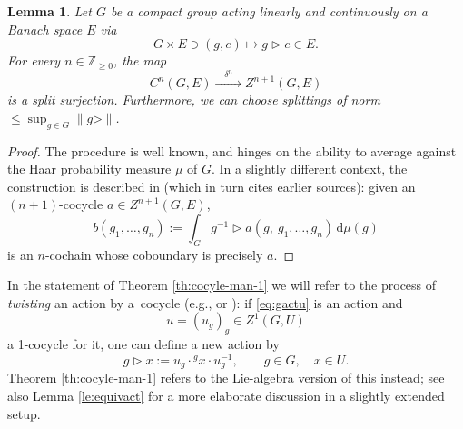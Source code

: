 \documentclass[11pt]{article}
\numberwithin{equation}{section}
\numberwithin{equation}{section}
\newtheorem{Lemma}[Theorem]{Lemma}
\newcommand\bZ{{\mathbb Z}}
\begin{document}
\begin{Lemma}\label{le:cansplit}
 Let $G$ be a compact group acting linearly and continuously on a Banach space $E$ via
 \begin{equation*}
 G\times E\ni (g,e)\mapsto g\triangleright e\in E.
 \end{equation*}
 For every $n\in \bZ_{\ge 0}$, the map
 \begin{equation*}%
 C^n(G,E)\xrightarrow{\quad\delta^n\quad} Z^{n+1}(G,E)
 \end{equation*}
 is a split surjection. Furthermore, we can choose splittings of norm $\le \sup_{g\in G}\|g\triangleright\|$.
\end{Lemma}
\begin{proof}
 The procedure is well known, and hinges on the ability to average against the Haar probability measure $\mu$ of $G$. In a slightly different context, the construction is described in \cite[Proof of Theorem~2.3]{moo-12} (which in turn cites earlier sources): given an $(n+1)$-cocycle ${a\in Z^{n+1}(G,E)}$,
 \begin{equation}\label{eq:splitgpcoc}
 b(g_1,\dots,g_{n}):=\int_{G}g^{-1}\triangleright a(g,\ g_1,\dots,g_n)\, \mathrm{d}\mu(g)
 \end{equation}
 is an $n$-cochain whose coboundary is precisely $a$.
\end{proof}

In the statement of Theorem \ref{th:cocyle-man-1} we will refer to the process of {\it twisting} an action by a~cocycle (e.g., \cite[Section~I.5.3, Example 2 preceding Proposition 34]{ser-gal} or \cite[Definition X.1.4, equation~(8)]{tak2}): if \eqref{eq:gactu} is an action and
\begin{equation*}
 u = (u_g)_g\in Z^1(G,U)
\end{equation*}
a 1-cocycle for it, one can define a new action by
\begin{equation*}
 g\triangleright x := u_g \cdot {}^g x \cdot u_g^{-1},\qquad g\in G,\quad x\in U.
\end{equation*}
Theorem \ref{th:cocyle-man-1} refers to the Lie-algebra version of this instead; see also Lemma \ref{le:equivact} for a more elaborate discussion in a slightly extended setup.
\end{document}
